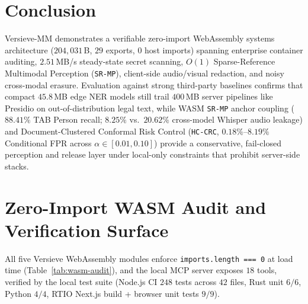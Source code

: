 \documentclass{article}
\begin{document}
\section{Conclusion}
\label{sec:conclusion}

Versieve-MM demonstrates a verifiable zero-import WebAssembly systems architecture ($204{,}031$\,B, $29$ exports, $0$ host imports) spanning enterprise container auditing, $2.51$\,MB/s steady-state secret scanning, $O(1)$ Sparse-Reference Multimodal Perception (\texttt{SR-MP}), client-side audio/visual redaction, and noisy cross-modal erasure. Evaluation against strong third-party baselines confirms that compact $45.8$\,MB edge NER models still trail $400$\,MB server pipelines like Presidio on out-of-distribution legal text, while WASM \texttt{SR-MP} anchor coupling ($88.41\%$ TAB Person recall; $8.25\%$ vs.\ $20.62\%$ cross-model Whisper audio leakage) and Document-Clustered Conformal Risk Control (\texttt{HC-CRC}, $0.18\%$--$8.19\%$ Conditional FPR across $\alpha \in [0.01, 0.10]$) provide a conservative, fail-closed perception and release layer under local-only constraints that prohibit server-side stacks.




\appendix
\section{Zero-Import WASM Audit and Verification Surface}
\label{app:audit}

All five Versieve WebAssembly modules enforce \texttt{imports.length === 0} at load time (Table~\ref{tab:wasm-audit}), and the local MCP server exposes $18$ tools, verified by the local test suite (Node.js CI $248$ tests across $42$ files, Rust unit $6/6$, Python $4/4$, RTIO Next.js build + browser unit tests $9/9$).

\begin{table}[h]
\caption{Load-time zero-import audit across all five Versieve WebAssembly modules.}
\label{tab:wasm-audit}
\vskip 0.08in
\begin{center}
\end{center}
\vskip -0.10in
\end{table}
\end{document}
